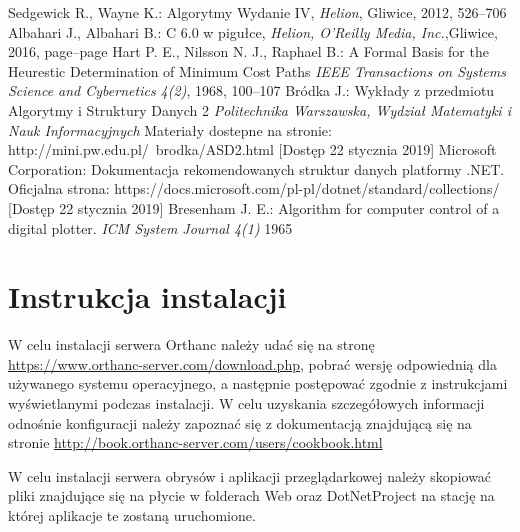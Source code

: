\documentclass[a4paper,11pt,twoside]{report}
\theoremstyle{definition}
\begin{document}
\begin{thebibliography}{20}
 Sedgewick R., Wayne K.: Algorytmy Wydanie IV, \emph{Helion}, Gliwice, 2012, 526--706
 Albahari J., Albahari B.: C 6.0 w pigułce, \emph{Helion, O'Reilly Media, Inc.},Gliwice, 2016, page--page
 Hart P. E., Nilsson N. J., Raphael B.: A Formal Basis for the Heurestic Determination of Minimum Cost Paths \emph{IEEE Transactions on Systems Science and Cybernetics 4(2)}, 1968, 100--107
 Bródka J.: Wykłady z przedmiotu Algorytmy i Struktury Danych 2 \emph{Politechnika Warszawska, Wydział Matematyki i Nauk Informacyjnych} Materiały dostepne na stronie: http://mini.pw.edu.pl/~brodka/ASD2.html [Dostęp 22 stycznia 2019]
 Microsoft Corporation: Dokumentacja rekomendowanych struktur danych platformy .NET. Oficjalna strona: https://docs.microsoft.com/pl-pl/dotnet/standard/collections/ [Dostęp 22 stycznia 2019]
 Bresenham J. E.: Algorithm for computer control of a digital plotter. \emph{ICM System Journal 4(1)} 1965
\end{thebibliography}





\chapter*{Instrukcja instalacji}

W celu instalacji serwera Orthanc należy udać się na stronę \url{https://www.orthanc-server.com/download.php}, pobrać wersję odpowiednią dla używanego systemu operacyjnego, a następnie postępować zgodnie z instrukcjami wyświetlanymi podczas instalacji. W celu uzyskania szczegółowych informacji odnośnie konfiguracji należy zapoznać się z dokumentacją znajdującą się na stronie \url{http://book.orthanc-server.com/users/cookbook.html}

W celu instalacji serwera obrysów i aplikacji przeglądarkowej należy skopiować pliki znajdujące się na płycie w folderach Web oraz DotNetProject na stację na której aplikacje te zostaną uruchomione. 
\end{document}
